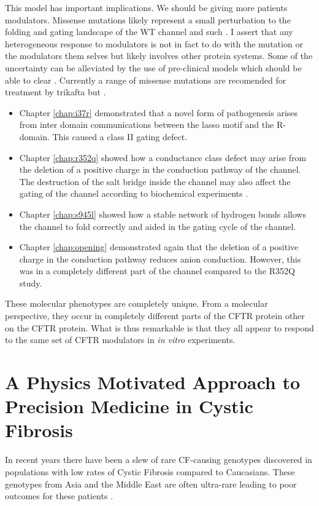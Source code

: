 This model has important implications. We should be giving more patients modulators. Missense mutations likely represent a small perturbation to the folding and gating landscape of the WT channel and such . I assert that any heterogeneous response to modulators is not in fact to do with the mutation or the modulators them selves but likely involves other protein systems. Some of the uncertainty can be alleviated by the use of pre-clinical models which should be able to clear . Currently a range of missense mutations are recomended for treatment by trikafta but .

\begin{itemize}
	\item Chapter \ref{chap:i37r} demonstrated that a novel form of pathogenesis arises from inter domain communications between the lasso motif and the R-domain.  This caused a class II gating defect. 
\item Chapter \ref{chap:r352q} showed how a conductance class defect may arise from the deletion of a positive charge in the conduction pathway of the channel. The destruction of the salt bridge inside the channel may also affect the gating of the channel according to biochemical experiments \cite{}.
\item Chapter \ref{chap:s945l} showed how a stable network of hydrogen bonds allows the channel to fold correctly and aided in the gating cycle of the channel. 
\item Chapter \ref{chap:opening} demonstrated again that the deletion of a positive charge in the conduction pathway reduces anion conduction. However, this was in a completely different part of the channel compared to the R352Q study.
\end{itemize}

These molecular phenotypes are completely unique. From a molecular perspective, they occur in completely different parts of the CFTR protein other on the CFTR protein. What is thus remarkable is that they all appear to respond to the same set of CFTR modulators in \textit{in vitro} experiments.

\section{A Physics Motivated Approach to Precision Medicine in Cystic Fibrosis}


In recent years there have been a slew of rare CF-causing genotypes discovered in populations with low rates of Cystic Fibrosis compared to Caucasians. These genotypes from Asia and the Middle East are often ultra-rare leading to poor outcomes for these patients \cite{}. 



